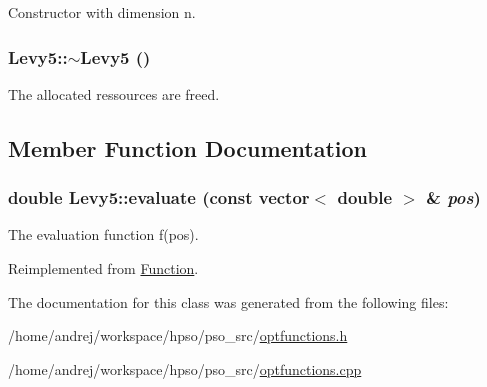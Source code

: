 Constructor with dimension n. 

\hypertarget{classLevy5_8a7751f0616e3846d8a6b27af0f79062}{
\subsubsection{\setlength{\rightskip}{0pt plus 5cm}Levy5::$\sim$Levy5 ()}}
\label{classLevy5_8a7751f0616e3846d8a6b27af0f79062}


The allocated ressources are freed. 



\subsection{Member Function Documentation}
\hypertarget{classLevy5_ac62f31602725e819687853a95068331}{
\subsubsection{\setlength{\rightskip}{0pt plus 5cm}double Levy5::evaluate (const vector$<$ double $>$ \& {\em pos})}}
\label{classLevy5_ac62f31602725e819687853a95068331}


The evaluation function f(pos). 



Reimplemented from \hyperlink{classFunction_159260a1fc3afa8932491e4057b6b844}{Function}.

The documentation for this class was generated from the following files:\begin{CompactItemize}
\item 
/home/andrej/workspace/hpso/pso\_\-src/\hyperlink{optfunctions_8h}{optfunctions.h}\item 
/home/andrej/workspace/hpso/pso\_\-src/\hyperlink{optfunctions_8cpp}{optfunctions.cpp}\end{CompactItemize}
